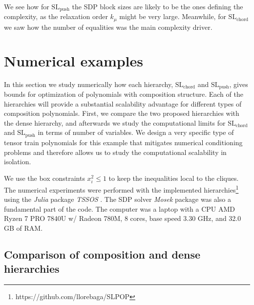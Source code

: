 \documentclass[11pt,a4paper]{article}
\theoremstyle{definition}
\begin{document}
We see how for $\mathrm{SL}_{\mathrm{push}}$ the SDP block sizes are likely to be the ones defining the complexity, as the relaxation order $k_{\mu}$ might be very large. Meanwhile, for $\mathrm{SL}_{\mathrm{chord}}$ we saw how the number of equalities was the main complexity driver.


\section{Numerical examples}
\label{sec:examples}

In this section we study numerically how each hierarchy, $\mathrm{SL}_{\mathrm{chord}}$ and $\mathrm{SL}_{\mathrm{push}}$, gives bounds for optimization of polynomials with composition structure. Each of the hierarchies will provide a substantial scalability advantage for different types of composition polynomials. First, we compare the two proposed hierarchies with the dense hierarchy, and afterwards we study the computational limits for $\mathrm{SL}_{\mathrm{chord}}$ and $\mathrm{SL}_{\mathrm{push}}$ in terms of number of variables. We design a very specific type of tensor train polynomials for this example that mitigates numerical conditioning problems and therefore allows us to study the computational scalability in isolation.

We use the box constraints $x_i^2\leq 1$ to keep the inequalities local to the cliques. The numerical experiments were performed with the implemented hierarchies\footnote{https://github.com/llorebaga/SLPOP} using the \textit{Julia} \cite{Julia-2017} package \textit{TSSOS} \cite{Magron2021}. The SDP solver \textit{Mosek} \cite{Mosek} package was also a fundamental part of the code. The computer was a laptop with a CPU AMD Ryzen 7 PRO 7840U w/ Radeon 780M, 8 cores, base speed 3.30 GHz, and 32.0 GB of RAM.

\subsection{Comparison of composition and dense hierarchies}
\end{document}
